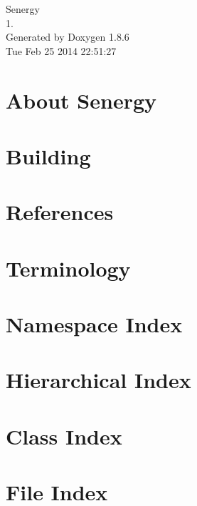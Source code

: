 \documentclass[twoside]{book}
\newcommand{\clearemptydoublepage}{%
  \newpage{\pagestyle{empty}\cleardoublepage}%
}
\begin{document}
\hypersetup{pageanchor=false}
\begin{titlepage}
\vspace*{7cm}
\begin{center}%
{\Large Senergy \\[1ex]\large 1. }\\
\vspace*{1cm}
{\large Generated by Doxygen 1.8.6}\\
\vspace*{0.5cm}
{\small Tue Feb 25 2014 22:51:27}\\
\end{center}
\end{titlepage}
\clearemptydoublepage
\tableofcontents
\clearemptydoublepage
{}
\hypersetup{pageanchor=true}

\chapter{About Senergy}
\label{index}\hypertarget{index}{}
\chapter{Building}
\label{building}
\hypertarget{building}{}

\chapter{References}
\label{references}
\hypertarget{references}{}

\chapter{Terminology}
\label{terminology}
\hypertarget{terminology}{}

\chapter{Namespace Index}

\chapter{Hierarchical Index}

\chapter{Class Index}

\chapter{File Index}

\end{document}
